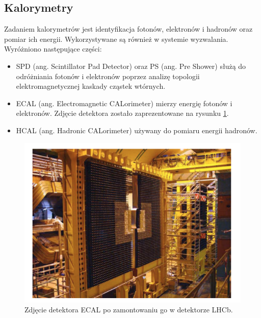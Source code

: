 \subsection{Kalorymetry}
Zadaniem  kalorymetrów jest identyfikacja fotonów, elektronów i hadronów oraz pomiar ich energii. Wykorzystywane są również w systemie wyzwalania. Wyróżniono następujące części:
\begin{itemize}
\item SPD (ang. Scintillator Pad Detector) oraz PS (ang. Pre Shower) służą do odróżniania fotonów i elektronów poprzez analizę topologii elektromagnetycznej kaskady cząstek wtórnych.
\item ECAL (ang. Electromagnetic CALorimeter) mierzy energię fotonów i elektronów. Zdjęcie detektora zostało zaprezentowane na rysunku \ref{fig:ECAl}.
\item HCAL (ang. Hadronic CALorimeter) używany do pomiaru energii hadronów.
\end{itemize}
\begin{figure}[th] 
  \centering
  \includegraphics[scale=0.4]{rozdzial2/ECAL.png}
  \caption{Zdjęcie detektora ECAL po zamontowaniu go w detektorze LHCb.}
  \label{fig:ECAl}
\end{figure}



